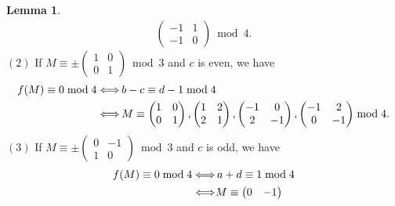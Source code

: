 \documentclass[12pt]{article}
\theoremstyle{definition}
\newtheorem{lemma}[theorem]{Lemma}
\numberwithin{equation}{section}
\numberwithin{theorem}{section}
\begin{document}
\begin{lemma}
{\begin{align}
\begin{pmatrix}
-1 & 1 \\
-1 & 0
\end{pmatrix} \bmod{4}.   \label{eqn:level3-mod4-pmI-c-odd}
\end{align}
$\mathrm{(2)}$ If 
$
M
\equiv
\pm
\begin{pmatrix}
1 & 0 \\
0 & 1
\end{pmatrix}
\bmod{3}
$ 
and $c$ is even, we have  
\begin{align}
 \label{eqn:level3-mod4-pmI-c-even}
f(M)\equiv 0 \bmod{4} 
\Longleftrightarrow& 
\, b-c\equiv d-1 \bmod{4} \notag \\
\Longleftrightarrow& \, 
M
\equiv 
\begin{pmatrix}
1 & 0 \\
0 & 1
\end{pmatrix}, 
\begin{pmatrix}
1 & 2 \\
2 & 1
\end{pmatrix}, 
\begin{pmatrix}
-1 & 0 \\
2 & -1
\end{pmatrix}, 
\begin{pmatrix}
-1 & 2 \\
0 & -1
\end{pmatrix} 
\bmod{4}.
\end{align}
$\mathrm{(3)}$ If 
$
M
\equiv
\pm
\begin{pmatrix}
0 & -1 \\
1 & 0
\end{pmatrix}
\bmod{3}
$ 
and $c$ is odd, 
we have 
\begin{align}
f(M)\equiv 0 \bmod{4} 
\Longleftrightarrow&
\, a+d\equiv 1 \bmod{4}  \notag \\
\Longleftrightarrow&
M
\equiv
\begin{pmatrix}
0 & -1 \\

\end{pmatrix}
\end{align}}
\end{lemma}
\end{document}
